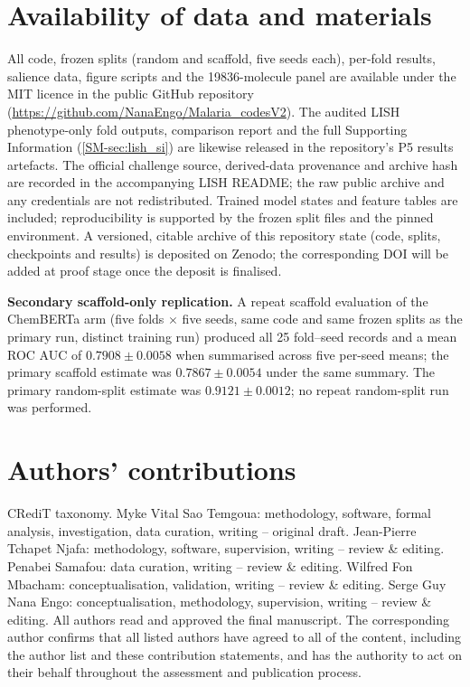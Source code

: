 \documentclass[11pt,a4paper]{article}
\begin{document}
\section*{Availability of data and materials}

All code, frozen splits (random and scaffold, five seeds each), per-fold results, salience data, figure scripts and the \num{19836}-molecule panel are available under the MIT licence in the public GitHub repository (\url{https://github.com/NanaEngo/Malaria_codesV2}). The audited LISH phenotype-only fold outputs, comparison report and the full Supporting Information (\cref{SM-sec:lish_si}) are likewise released in the repository's P5 results artefacts. The official challenge source, derived-data provenance and archive hash are recorded in the accompanying LISH README; the raw public archive and any credentials are not redistributed. Trained model states and feature tables are included; reproducibility is supported by the frozen split files and the pinned environment. A versioned, citable archive of this repository state (code, splits, checkpoints and results) is deposited on Zenodo; the corresponding DOI will be added at proof stage once the deposit is finalised.

\noindent\textbf{Secondary scaffold-only replication.} A repeat scaffold evaluation of the ChemBERTa arm (five folds $\times$ five seeds, same code and same frozen splits as the primary run, distinct training run) produced all \num{25} fold--seed records and a mean ROC AUC of $\num{0.7908} \pm \num{0.0058}$ when summarised across five per-seed means; the primary scaffold estimate was $\num{0.7867} \pm \num{0.0054}$ under the same summary. The primary random-split estimate was $\num{0.9121} \pm \num{0.0012}$; no repeat random-split run was performed.

\section*{Authors' contributions}

CRediT taxonomy. Myke Vital Sao Temgoua: methodology, software, formal analysis, investigation, data curation, writing -- original draft. Jean-Pierre Tchapet Njafa: methodology, software, supervision, writing -- review \& editing. Penabei Samafou: data curation, writing -- review \& editing. Wilfred Fon Mbacham: conceptualisation, validation, writing -- review \& editing. Serge Guy Nana Engo: conceptualisation, methodology, supervision, writing -- review \& editing. All authors read and approved the final manuscript. The corresponding author confirms that all listed authors have agreed to all of the content, including the author list and these contribution statements, and has the authority to act on their behalf throughout the assessment and publication process.
\end{document}
